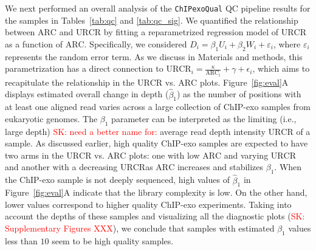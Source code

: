 \documentclass{bmcart}
\newcommand{\pname}[1]{\texttt{ChIPexoQual}}
\newcommand{\SK}[1]{\textcolor{red}{SK: #1}}
\begin{document}
We next performed an overall analysis of the \pname{} 
QC pipeline results for the samples in Tables~\ref{tab:qc} and
\ref{tab:qc_sig}.  We  quantified the relationship between $\mbox{ARC}$ and $\mbox{URCR}$ by fitting a reparametrized regression model of $\mbox{URCR}$ as a function of  $\mbox{ARC}$.   Specifically, we considered $D_i = \beta_1 U_i +\beta_2 W_i +\varepsilon_i$, where 
$\varepsilon_i$ represents the random error term.  As we discuss in Materials and methods, this parametrization has a direct connection to $\mbox{URCR}_i = \frac{\kappa}{\mbox{ARC}_i} + \gamma+ \epsilon_i$,   which aims to recapitulate the relationship in the  $\mbox{URCR}$ vs. $\mbox{ARC}$ plots.
Figure~\ref{fig:eval}A displays estimated
overall change in depth ($\hat{\beta}_1$) as the number of positions with at least one aligned read varies across a large collection of ChIP-exo samples from eukaryotic genomes. The $\beta_1$ parameter can be interpreted as the  limiting (i.e., large depth) 
\SK{need a better name for:} average read depth intensity $\mbox{URCR}$ of a sample.
As discussed earlier, high
quality ChIP-exo samples are expected to have two arms in the $\mbox{URCR}$
vs. $\mbox{ARC}$ plots: one with low $\mbox{ARC}$
and varying $\mbox{URCR}$ and another with a decreasing
$\mbox{URCR}$as  $\mbox{ARC}$ increases and stabilizes
$\beta_1$. When the ChIP-exo sample is not deeply sequenced, high
values of $\hat{\beta}_1$ in  Figure~\ref{fig:eval}A indicate that the library complexity
is low. On the other hand, lower values correspond
to higher quality ChIP-exo experiments. Taking into account the depths of these samples and visualizing all the diagnostic plots (\SK{Supplementary Figures XXX}), we conclude that samples with estimated $\beta_1$ values less than $10$ seem to be high quality samples.
\end{document}
